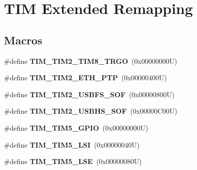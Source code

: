 \hypertarget{group___t_i_m_ex___remap}{}\section{T\+IM Extended Remapping}
\label{group___t_i_m_ex___remap}
\subsection*{Macros}
\begin{DoxyCompactItemize}
\item 
\mbox{\label{group___t_i_m_ex___remap_ga3dbfe224567e0b568859a4c749c83d1c}} 
\#define {\bfseries T\+I\+M\+\_\+\+T\+I\+M2\+\_\+\+T\+I\+M8\+\_\+\+T\+R\+GO}~(0x00000000\+U)
\item 
\mbox{\label{group___t_i_m_ex___remap_ga63b5bc00517eecfa1dbf6b7d7cf56135}} 
\#define {\bfseries T\+I\+M\+\_\+\+T\+I\+M2\+\_\+\+E\+T\+H\+\_\+\+P\+TP}~(0x00000400\+U)
\item 
\mbox{\label{group___t_i_m_ex___remap_ga263984d585fd682730d3199da47dd803}} 
\#define {\bfseries T\+I\+M\+\_\+\+T\+I\+M2\+\_\+\+U\+S\+B\+F\+S\+\_\+\+S\+OF}~(0x00000800\+U)
\item 
\mbox{\label{group___t_i_m_ex___remap_ga8e47d56e9e9c9583b85a4c7b9f98931a}} 
\#define {\bfseries T\+I\+M\+\_\+\+T\+I\+M2\+\_\+\+U\+S\+B\+H\+S\+\_\+\+S\+OF}~(0x00000\+C00\+U)
\item 
\mbox{\label{group___t_i_m_ex___remap_ga8525d77a5f6fea05530e812e991e4d6d}} 
\#define {\bfseries T\+I\+M\+\_\+\+T\+I\+M5\+\_\+\+G\+P\+IO}~(0x00000000\+U)
\item 
\mbox{\label{group___t_i_m_ex___remap_ga62000fc12a4ed5909723b881533a2f93}} 
\#define {\bfseries T\+I\+M\+\_\+\+T\+I\+M5\+\_\+\+L\+SI}~(0x00000040\+U)
\item 
\mbox{\label{group___t_i_m_ex___remap_ga9f09de021d2f68730c952b4f0ebb82bc}} 
\#define {\bfseries T\+I\+M\+\_\+\+T\+I\+M5\+\_\+\+L\+SE}~(0x00000080\+U)
\item 
\mbox{\label{group___t_i_m_ex___remap_ga93e312581ffb28601b36b4f8b240df79}} 

\end{DoxyCompactItemize}
